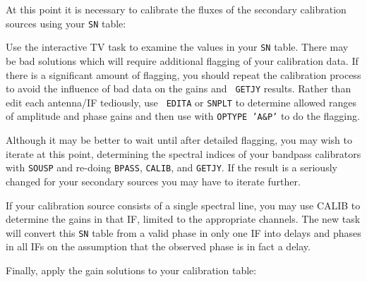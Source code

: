 At this point it is necessary to calibrate the fluxes of the secondary
calibration sources using your {\tt SN} table:

Use the interactive TV task {\tt {}} to examine the values
in your {\tt SN} table.  There may be bad solutions which will require
additional flagging of your calibration data.  If there is a
significant amount of flagging, you should repeat the calibration
process to avoid the influence of bad data on the gains and {\tt
GETJY} results.  Rather than edit each antenna/IF tediously, use {\tt
EDITA} or {\tt SNPLT} to determine allowed ranges of amplitude and
phase gains and then use {\tt {}} with {\tt OPTYPE 'A\&P'}
to do the flagging.

Although it may be better to wait until after detailed flagging,
you may wish to iterate at this point, determining the spectral
indices of your bandpass calibrators with {\tt SOUSP} and re-doing
{\tt BPASS}, {\tt CALIB}, and {\tt GETJY}\@.  If the result is a
seriously changed  for your secondary sources you
may have to iterate further.

If your calibration source consists of a single spectral line, you may
use CALIB to determine the gains in that IF, limited to the
appropriate channels.  The new task {\tt {}} will convert
this {\tt SN} table from a valid phase in only one IF into delays and
phases in all IFs on the assumption that the observed phase is in fact
a delay.

Finally, apply the gain solutions to your calibration table:

